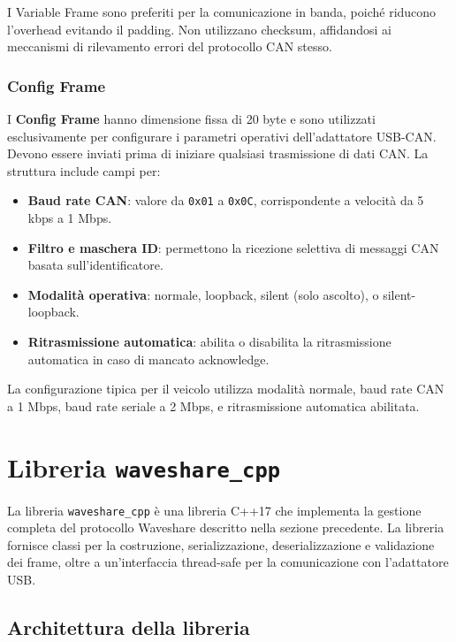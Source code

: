 I Variable Frame sono preferiti per la comunicazione in banda, poiché riducono l'overhead evitando il padding. Non utilizzano checksum, affidandosi ai meccanismi di rilevamento errori del protocollo CAN stesso.

\subsubsection{Config Frame}

I \textbf{Config Frame} hanno dimensione fissa di 20 byte e sono utilizzati esclusivamente per configurare i parametri operativi dell'adattatore USB-CAN. Devono essere inviati prima di iniziare qualsiasi trasmissione di dati CAN. La struttura include campi per:

\begin{itemize}
    \item \textbf{Baud rate CAN}: valore da \texttt{0x01} a \texttt{0x0C}, corrispondente a velocità da 5 kbps a 1 Mbps.
    \item \textbf{Filtro e maschera ID}: permettono la ricezione selettiva di messaggi CAN basata sull'identificatore.
    \item \textbf{Modalità operativa}: normale, loopback, silent (solo ascolto), o silent-loopback.
    \item \textbf{Ritrasmissione automatica}: abilita o disabilita la ritrasmissione automatica in caso di mancato acknowledge.
\end{itemize}

La configurazione tipica per il veicolo utilizza modalità normale, baud rate CAN a 1 Mbps, baud rate seriale a 2 Mbps, e ritrasmissione automatica abilitata.

\section{Libreria \texttt{waveshare\_cpp}}
\label{sec:libreria_waveshare}

La libreria \texttt{waveshare\_cpp} è una libreria C++17 che implementa la gestione completa del protocollo Waveshare descritto nella sezione precedente. La libreria fornisce classi per la costruzione, serializzazione, deserializzazione e validazione dei frame, oltre a un'interfaccia thread-safe per la comunicazione con l'adattatore USB.

\subsection{Architettura della libreria}

